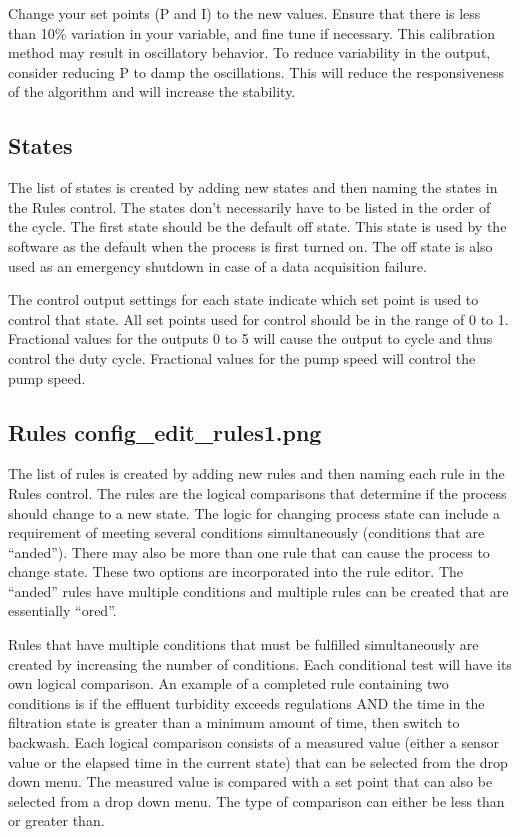 \documentclass[letterpaper,10pt,english]{sphinxmanual}
\begin{document}
Change your set points (P and I) to the new values. Ensure that there is less than 10\% variation in your variable, and fine tune if necessary. This calibration method may result in oscillatory behavior. To reduce variability in the output, consider reducing P to damp the oscillations. This will reduce the responsiveness of the algorithm and will increase the stability.


\subsection{States}
\label{\detokenize{ProCoDA/ProCoDA:states}}\label{\detokenize{ProCoDA/ProCoDA:heading-procoda-states}}
The list of states is created by adding new states and then naming the states in the Rules control. The states don’t necessarily have to be listed in the order of the cycle. The first state should be the default off state. This state is used by the software as the default when the process is first turned on. The off state is also used as an emergency shutdown in case of a data acquisition failure.

The control output settings for each state indicate which set point is used to control that state. All set points used for control should be in the range of 0 to 1. Fractional values for the outputs 0 to 5 will cause the output to cycle and thus control the duty cycle. Fractional values for the pump speed will control the pump speed.


\subsection[Rules]{Rules \lowercase{\sphinxincludegraphics}{{config_edit_rules1}.png}}
\label{\detokenize{ProCoDA/ProCoDA:rules-config-edit-rules}}\label{\detokenize{ProCoDA/ProCoDA:heading-procoda-rules}}
The list of rules is created by adding new rules and then naming each rule in the Rules control. The rules are the logical comparisons that determine if the process should change to a new state. The logic for changing process state can include a requirement of meeting several conditions simultaneously (conditions that are “anded”). There may also be more than one rule that can cause the process to change state. These two options are incorporated into the rule editor. The “anded” rules have multiple conditions and multiple rules can be created that are essentially “ored”.

Rules that have multiple conditions that must be fulfilled simultaneously are created by increasing the number of conditions. Each conditional test will have its own logical comparison. An example of a completed rule containing two conditions is if the effluent turbidity exceeds regulations AND the time in the filtration state is greater than a minimum amount of time, then switch to backwash. Each logical comparison consists of a measured value (either a sensor value or the elapsed time in the current state) that can be selected from the drop down menu. The measured value is compared with a set point that can also be selected from a drop down menu. The type of comparison can either be less than or greater than.
\end{document}
